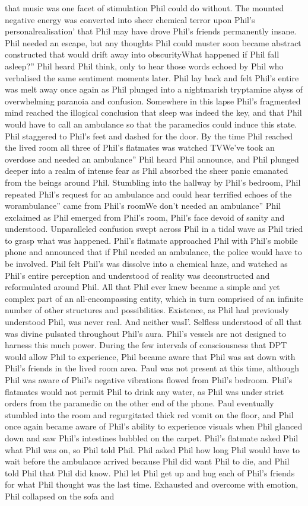 \documentclass[12pt]{book}
\begin{document}
that music was one facet of stimulation Phil could do without. The mounted negative energy was converted into sheer chemical terror upon Phil's personalrealisation' that Phil may have drove Phil's friends permanently insane. Phil needed an escape, but any thoughts Phil could muster soon became abstract constructed that would drift away into obscurityWhat happened if Phil fall asleep?'' Phil heard Phil think, only to hear those words echoed by Phil who verbalised the same sentiment moments later. Phil lay back and felt Phil's entire was melt away once again as Phil plunged into a nightmarish tryptamine abyss of overwhelming paranoia and confusion. Somewhere in this lapse Phil's fragmented mind reached the illogical conclusion that sleep was indeed the key, and that Phil would have to call an ambulance so that the paramedics could induce this state. Phil staggered to Phil's feet and dashed for the door. By the time Phil reached the lived room all three of Phil's flatmates was watched TVWe've took an overdose and needed an ambulance'' Phil heard Phil announce, and Phil plunged deeper into a realm of intense fear as Phil absorbed the sheer panic emanated from the beings around Phil. Stumbling into the hallway by Phil's bedroom, Phil repeated Phil's request for an ambulance and could hear terrified echoes of the worambulance'' came from Phil's roomWe don't needed an ambulance'' Phil exclaimed as Phil emerged from Phil's room, Phil's face devoid of sanity and understood. Unparalleled confusion swept across Phil in a tidal wave as Phil tried to grasp what was happened. Phil's flatmate approached Phil with Phil's mobile phone and announced that if Phil needed an ambulance, the police would have to be involved. Phil felt Phil's was dissolve into a chemical haze, and watched as Phil's entire perception and understood of reality was deconstructed and reformulated around Phil. All that Phil ever knew became a simple and yet complex part of an all-encompassing entity, which in turn comprised of an infinite number of other structures and possibilities. Existence, as Phil had previously understood Phil, was never real. And neither wasI'. Selfless understood of all that was divine pulsated throughout Phil's aura. Phil's vessels are not designed to harness this much power. During the few intervals of consciousness that DPT would allow Phil to experience, Phil became aware that Phil was sat down with Phil's friends in the lived room area. Paul was not present at this time, although Phil was aware of Phil's negative vibrations flowed from Phil's bedroom. Phil's flatmates would not permit Phil to drink any water, as Phil was under strict orders from the paramedic on the other end of the phone. Paul eventually stumbled into the room and regurgitated thick red vomit on the floor, and Phil once again became aware of Phil's ability to experience visuals when Phil glanced down and saw Phil's intestines bubbled on the carpet. Phil's flatmate asked Phil what Phil was on, so Phil told Phil. Phil asked Phil how long Phil would have to wait before the ambulance arrived because Phil did want Phil to die, and Phil told Phil that Phil did know. Phil let Phil get up and hug each of Phil's friends for what Phil thought was the last time. Exhausted and overcome with emotion, Phil collapsed on the sofa and 
\end{document}
